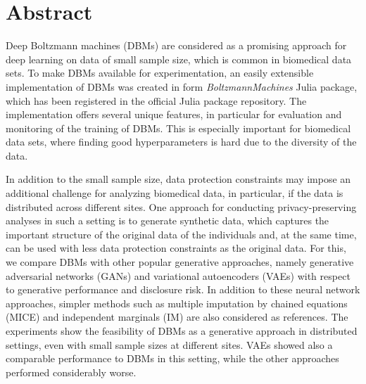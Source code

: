 \documentclass[12pt]{article}
\newcommand{\apkg}[1]{\emph{#1}}
\begin{document}



\tableofcontents
\newpage
\onehalfspacing
\setlength{\emergencystretch}{3em}

\section*{Abstract}


Deep Boltzmann machines (DBMs) are considered as a promising approach for deep learning on data of small sample size, which is common in biomedical data sets.
To make DBMs available for experimentation, an easily extensible implementation of DBMs was created in form \apkg{BoltzmannMachines} Julia package, which has been registered in the official Julia package repository.
The implementation offers several unique features, in particular for evaluation and monitoring of the training of DBMs.
This is especially important for biomedical data sets, where finding good hyperparameters is hard due to the diversity of the data.

In addition to the small sample size, data protection constraints may impose an additional challenge for analyzing biomedical data, in particular, if the data is distributed across different sites.
One approach for conducting privacy-preserving analyses in such a setting is to generate synthetic data, which captures the important structure of the original data of the individuals and, at the same time, can be used with less data protection constraints as the original data.
For this, we compare DBMs with other popular generative approaches, namely generative adversarial networks (GANs) and variational autoencoders (VAEs) with respect to generative performance and disclosure risk.
In addition to these neural network approaches, simpler methods such as multiple imputation by chained equations (MICE) and independent marginals (IM) are also considered as references.
The experiments show the feasibility of DBMs as a generative approach in distributed settings, even with small sample sizes at different sites.
VAEs showed also a comparable performance to DBMs in this setting, while the other approaches performed considerably worse.
\end{document}
